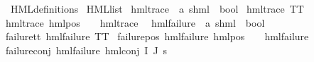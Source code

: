 %
\begin{isabellebody}%
%
%
\isadelimtheory
%
\endisadelimtheory
%
\isatagtheory
{}\isamarkupfalse%
\ HML{\isacharunderscore}{\kern0pt}definitions\isanewline
{}\ HML{\isacharunderscore}{\kern0pt}list\isanewline
{}%
\endisatagtheory
{\isafoldtheory}%
%
\isadelimtheory
\isanewline
%
\endisadelimtheory
\isanewline
{}\isamarkupfalse%
\ hml{\isacharunderscore}{\kern0pt}trace\ {\isacharcolon}{\kern0pt}{\isacharcolon}{\kern0pt}\ {\isachardoublequoteopen}{\isacharparenleft}{\kern0pt}{\isacharprime}{\kern0pt}a{\isacharcomma}{\kern0pt}\ {\isacharprime}{\kern0pt}s{\isacharparenright}{\kern0pt}hml\ {\isasymRightarrow}\ bool{\isachardoublequoteclose}\ \isanewline
{\isachardoublequoteopen}hml{\isacharunderscore}{\kern0pt}trace\ TT{\isachardoublequoteclose}\ {\isacharbar}{\kern0pt}\isanewline
{\isachardoublequoteopen}hml{\isacharunderscore}{\kern0pt}trace\ {\isacharparenleft}{\kern0pt}hml{\isacharunderscore}{\kern0pt}pos\ {\isasymalpha}\ {\isasymphi}{\isacharparenright}{\kern0pt}{\isachardoublequoteclose}\ \ {\isachardoublequoteopen}hml{\isacharunderscore}{\kern0pt}trace\ {\isasymphi}{\isachardoublequoteclose}\isanewline
\isanewline
{}\isamarkupfalse%
\ hml{\isacharunderscore}{\kern0pt}failure\ {\isacharcolon}{\kern0pt}{\isacharcolon}{\kern0pt}\ {\isachardoublequoteopen}{\isacharparenleft}{\kern0pt}{\isacharprime}{\kern0pt}a{\isacharcomma}{\kern0pt}\ {\isacharprime}{\kern0pt}s{\isacharparenright}{\kern0pt}hml\ {\isasymRightarrow}\ bool{\isachardoublequoteclose}\isanewline
\ \ \isanewline
failure{\isacharunderscore}{\kern0pt}tt{\isacharcolon}{\kern0pt}\ {\isachardoublequoteopen}hml{\isacharunderscore}{\kern0pt}failure\ TT{\isachardoublequoteclose}\ {\isacharbar}{\kern0pt}\isanewline
failure{\isacharunderscore}{\kern0pt}pos{\isacharcolon}{\kern0pt}\ {\isachardoublequoteopen}hml{\isacharunderscore}{\kern0pt}failure\ {\isacharparenleft}{\kern0pt}hml{\isacharunderscore}{\kern0pt}pos\ {\isasymalpha}\ {\isasymphi}{\isacharparenright}{\kern0pt}{\isachardoublequoteclose}\ \ {\isachardoublequoteopen}hml{\isacharunderscore}{\kern0pt}failure\ {\isasymphi}{\isachardoublequoteclose}\ {\isacharbar}{\kern0pt}\isanewline
failure{\isacharunderscore}{\kern0pt}conj{\isacharcolon}{\kern0pt}\ {\isachardoublequoteopen}hml{\isacharunderscore}{\kern0pt}failure\ {\isacharparenleft}{\kern0pt}hml{\isacharunderscore}{\kern0pt}conj\ I\ J\ {\isasympsi}s{\isacharparenright}{\kern0pt}{\isachardoublequoteclose}\ \isanewline

\end{isabellebody}
